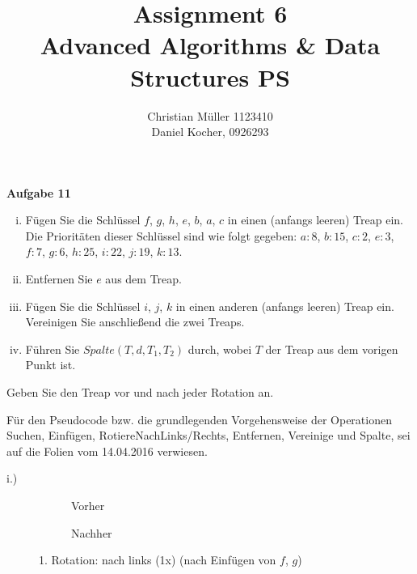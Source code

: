 \documentclass{article}
\begin{document}
\title{Assignment 6 \\ Advanced Algorithms \& Data Structures PS}%
\author{Christian Müller 1123410 \\ Daniel Kocher, 0926293}%
\maketitle

{\bfseries Aufgabe 11}%
{\parskip0pt
  \begin{enumerate}[i.)]
  \item F{\"u}gen Sie die Schl{\"u}ssel $f$, $g$, $h$, $e$, $b$, $a$, $c$ in einen
    (anfangs leeren) Treap ein. Die Priorit{\"a}ten dieser Schl{\"u}ssel sind
    wie folgt gegeben: $a:8$, $b:15$, $c:2$, $e:3$, $f:7$, $g:6$, $h:25$, $i:22$,
    $j:19$, $k:13$.
  \item Entfernen Sie $e$ aus dem Treap.
  \item F{\"u}gen Sie die Schl{\"u}ssel $i$, $j$, $k$ in einen anderen (anfangs
    leeren) Treap ein. Vereinigen Sie anschlie{\ss}end die zwei Treaps.
  \item F{\"u}hren Sie $Spalte \left( T, d, T_1, T_2 \right)$ durch, wobei $T$
    der Treap aus dem vorigen Punkt ist.
  \end{enumerate}
}
Geben Sie den Treap vor und nach jeder Rotation an.

\medskip%

F{\"u}r den Pseudocode bzw. die grundlegenden Vorgehensweise der Operationen
Suchen, Einf{\"u}gen, RotiereNachLinks/Rechts, Entfernen, Vereinige und Spalte,
sei auf die Folien vom 14.04.2016 verwiesen.

i.)

\begin{figure}[H]
  \centering
  \begin{subfigure}[b]{.4\textwidth}
    \centering
    \label{subfig:aufg9-i-1-before}
    \caption{Vorher}
  \end{subfigure}
  \quad
  \begin{subfigure}[b]{.4\textwidth}
    \centering
    \label{subfig:aufg9-i-1-after}
    \caption{Nachher}
  \end{subfigure}
  \label{fig:aufg9-i-1}
  \caption{1. Rotation: nach links (1x) (nach Einf{\"u}gen von $f$, $g$)}
\end{figure}
\end{document}
